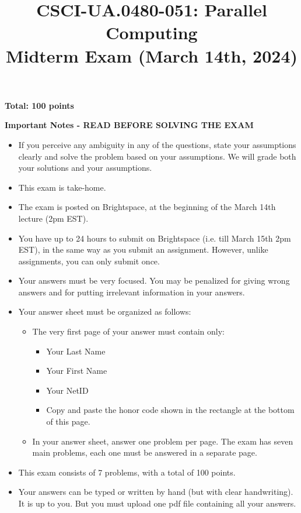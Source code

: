 \documentclass{article}
\title{CSCI-UA.0480-051: Parallel Computing \\ Midterm Exam (March 14th, 2024)}
\author{}
\date{}
\begin{document}
\maketitle

\textbf{Total: 100 points}

\textbf{Important Notes - READ BEFORE SOLVING THE EXAM}

\begin{itemize}
    \item If you perceive any ambiguity in any of the questions, state your assumptions clearly and solve the problem based on your assumptions. We will grade both your solutions and your assumptions.
    \item This exam is take-home.
    \item The exam is posted on Brightspace, at the beginning of the March 14th lecture (2pm EST).
    \item You have up to 24 hours to submit on Brightspace (i.e. till March 15th 2pm EST), in the same way as you submit an assignment. However, unlike assignments, you can only submit once.
    \item Your answers must be very focused. You may be penalized for giving wrong answers and for putting irrelevant information in your answers.
    \item Your answer sheet must be organized as follows:
    \begin{itemize}
        \item The very first page of your answer must contain only:
        \begin{itemize}
            \item Your Last Name
            \item Your First Name
            \item Your NetID
            \item Copy and paste the honor code shown in the rectangle at the bottom of this page.
        \end{itemize}
        \item In your answer sheet, answer one problem per page. The exam has seven main problems, each one must be answered in a separate page.
    \end{itemize}
    \item This exam consists of 7 problems, with a total of 100 points.
    \item Your answers can be typed or written by hand (but with clear handwriting). It is up to you. But you must upload one pdf file containing all your answers.
\end{itemize}
\end{document}
